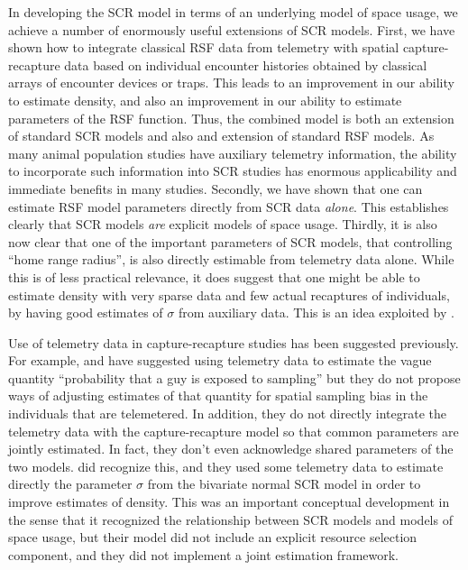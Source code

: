 In developing the SCR model in terms of an underlying model of space
usage, we achieve a number of enormously useful extensions of SCR
models. First, we have 
 shown how to integrate classical RSF data from telemetry
with spatial capture-recapture data based on individual encounter
histories obtained by classical arrays of encounter devices or
traps. This leads to an improvement in our ability to estimate
density, and also an improvement in our ability to estimate parameters
of the RSF function.  Thus, the combined model is both an extension of
standard SCR models and also and extension of standard RSF models. As
many animal population studies have auxiliary telemetry information,
the ability to incorporate such information into SCR studies has
enormous applicability and immediate benefits in many studies. 
Secondly, we have shown that one can estimate RSF model parameters
directly from SCR data {\it alone}. This establishes clearly that SCR
models {\it are} explicit models of space usage. Thirdly, it is also
now clear that one of the important parameters of SCR models, that
controlling ``home range radius'', is also directly estimable from
telemetry data alone. While this is of less practical relevance, it
does suggest that one might be able to estimate density with very
sparse data and few actual
recaptures of individuals, by having good estimates of $\sigma$ from
auxiliary data. This is an idea exploited by \citet{chandler_royle:2012}. 

Use of telemetry data in capture-recapture studies has been suggested
previously. For example, \citet{white_shenk:2001} and
\citet{ivan:2012} have suggested using telemetry data to estimate the
vague quantity ``probability that a guy is exposed to sampling'' but
they do not propose ways of adjusting estimates of that quantity for
spatial sampling bias in the individuals that are telemetered. In
addition, they do not directly integrate the telemetry data with the
capture-recapture model so that common parameters are jointly
estimated. In fact, they don't even acknowledge shared parameters of
the two models.  \citet{sollmann_etal:inprep} did recognize this, and
they used some telemetry data to estimate directly the parameter
$\sigma$ from the bivariate normal SCR model in order to improve
estimates of density. This was an important conceptual development in
the sense that it recognized the relationship between SCR models and
models of space usage, but their model did not include an explicit
resource selection component, and they did not implement a joint
estimation framework.

